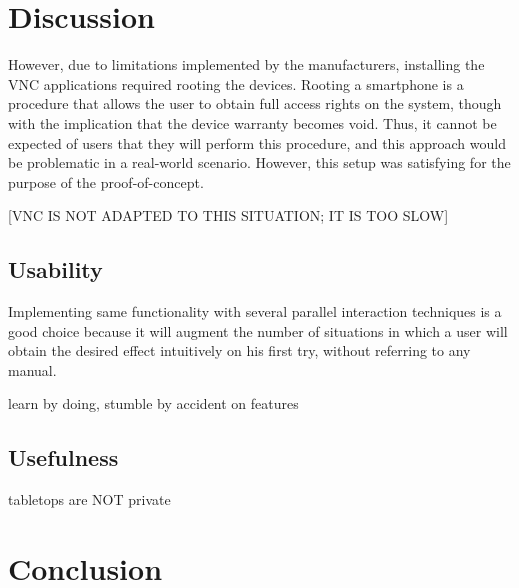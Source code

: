 \chapter{Discussion}
\label{discussion}




However, due to limitations implemented by the manufacturers, installing the VNC applications required rooting the devices.
Rooting a smartphone is a procedure that allows the user to obtain full access rights on the system, though with the implication that the device warranty becomes void.
Thus, it cannot be expected of users that they will perform this procedure, and this approach would be problematic in a real-world scenario.
However, this setup was satisfying for the purpose of the proof-of-concept.

[VNC IS NOT ADAPTED TO THIS SITUATION; IT IS TOO SLOW]



\section{Usability}

Implementing same functionality with several parallel interaction techniques is a good choice because it will augment the number of situations in which a user will obtain the desired effect intuitively on his first try, without referring to any manual.


learn by doing, stumble by accident on features

\section{Usefulness}

tabletops are NOT private

\chapter{Conclusion}
\label{conclusion}
